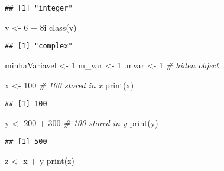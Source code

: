 \documentclass[
]{article}
\newenvironment{Shaded}{\begin{snugshade}}{\end{snugshade}}
\newcommand{\CommentTok}[1]{\textcolor[rgb]{0.56,0.35,0.01}{\textit{#1}}}
\newcommand{\DecValTok}[1]{\textcolor[rgb]{0.00,0.00,0.81}{#1}}
\newcommand{\FunctionTok}[1]{\textcolor[rgb]{0.00,0.00,0.00}{#1}}
\newcommand{\NormalTok}[1]{#1}
\newcommand{\OtherTok}[1]{\textcolor[rgb]{0.56,0.35,0.01}{#1}}
\newcommand{\SpecialCharTok}[1]{\textcolor[rgb]{0.00,0.00,0.00}{#1}}
\begin{document}
\begin{verbatim}
## [1] "integer"
\end{verbatim}

\begin{Shaded}
\begin{Highlighting}[]
\NormalTok{v }\OtherTok{\textless{}{-}} \DecValTok{6} \SpecialCharTok{+}\NormalTok{ 8i}
\FunctionTok{class}\NormalTok{(v)}
\end{Highlighting}
\end{Shaded}

\begin{verbatim}
## [1] "complex"
\end{verbatim}

\begin{Shaded}
\begin{Highlighting}[]
\NormalTok{minhaVariavel }\OtherTok{\textless{}{-}} \DecValTok{1}
\NormalTok{m\_var }\OtherTok{\textless{}{-}} \DecValTok{1}
\NormalTok{.mvar }\OtherTok{\textless{}{-}} \DecValTok{1} \CommentTok{\# hiden object}
\end{Highlighting}
\end{Shaded}

\begin{Shaded}
\begin{Highlighting}[]
\NormalTok{x }\OtherTok{\textless{}{-}} \DecValTok{100} \CommentTok{\# 100 stored in x}
\FunctionTok{print}\NormalTok{(x)}
\end{Highlighting}
\end{Shaded}

\begin{verbatim}
## [1] 100
\end{verbatim}

\begin{Shaded}
\begin{Highlighting}[]
\NormalTok{y }\OtherTok{\textless{}{-}} \DecValTok{200} \SpecialCharTok{+} \DecValTok{300} \CommentTok{\# 100 stored in y}
\FunctionTok{print}\NormalTok{(y)}
\end{Highlighting}
\end{Shaded}

\begin{verbatim}
## [1] 500
\end{verbatim}

\begin{Shaded}
\begin{Highlighting}[]
\NormalTok{z }\OtherTok{\textless{}{-}}\NormalTok{ x }\SpecialCharTok{+}\NormalTok{ y }
\FunctionTok{print}\NormalTok{(z)}
\end{Highlighting}
\end{Shaded}
\end{document}

